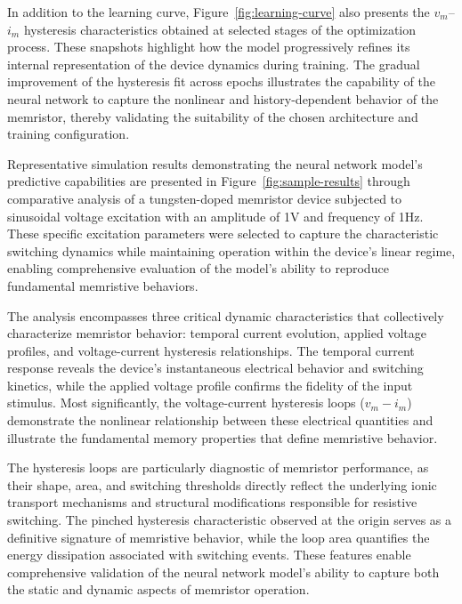 \documentclass[11pt, oneside]{article}
\begin{document}
In addition to the learning curve, Figure~\ref{fig:learning-curve} also presents the \(v_m\)--\(i_m\) hysteresis characteristics obtained at selected stages of the optimization process. These snapshots highlight how the model progressively refines its internal representation of the device dynamics during training. The gradual improvement of the hysteresis fit across epochs illustrates the capability of the neural network to capture the nonlinear and history-dependent behavior of the memristor, thereby validating the suitability of the chosen architecture and training configuration.


Representative simulation results demonstrating the neural network model's predictive capabilities are presented in Figure~\ref{fig:sample-results} through comparative analysis of a tungsten-doped memristor device subjected to sinusoidal voltage excitation with an amplitude of 1V and frequency of 1Hz. These specific excitation parameters were selected to capture the characteristic switching dynamics while maintaining operation within the device's linear regime, enabling comprehensive evaluation of the model's ability to reproduce fundamental memristive behaviors.

The analysis encompasses three critical dynamic characteristics that collectively characterize memristor behavior: temporal current evolution, applied voltage profiles, and voltage-current hysteresis relationships. The temporal current response reveals the device's instantaneous electrical behavior and switching kinetics, while the applied voltage profile confirms the fidelity of the input stimulus. Most significantly, the voltage-current hysteresis loops (\(v_m - i_m\)) demonstrate the nonlinear relationship between these electrical quantities and illustrate the fundamental memory properties that define memristive behavior.

The hysteresis loops are particularly diagnostic of memristor performance, as their shape, area, and switching thresholds directly reflect the underlying ionic transport mechanisms and structural modifications responsible for resistive switching. The pinched hysteresis characteristic observed at the origin serves as a definitive signature of memristive behavior, while the loop area quantifies the energy dissipation associated with switching events. These features enable comprehensive validation of the neural network model's ability to capture both the static and dynamic aspects of memristor operation.
\end{document}
